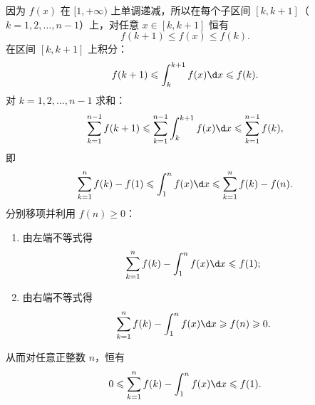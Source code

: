 \begin{solution}
    因为 $f(x)$ 在 $[1, +\infty)$ 上单调递减，所以在每个子区间 $[k, k+1]$（$k = 1, 2, \dots, n-1$）上，对任意 $x \in [k, k+1]$ 恒有
    \begin{equation}
        f(k+1) \leqslant f(x) \leqslant f(k).
    \end{equation}
    在区间 $[k, k+1]$ 上积分：
    \begin{equation}
        f(k+1) \leqslant \int_k^{k+1} f(x) \d x \leqslant f(k).
    \end{equation}
    对 $k = 1, 2, \dots, n-1$ 求和：
    \begin{equation}
        \sum_{k=1}^{n-1} f(k+1) \leqslant \sum_{k=1}^{n-1} \int_k^{k+1} f(x) \d x \leqslant \sum_{k=1}^{n-1} f(k),
    \end{equation}
    即
    \begin{equation}
        \sum_{k=1}^n f(k) - f(1) \leqslant \int_1^n f(x) \d x \leqslant \sum_{k=1}^n f(k) - f(n).
    \end{equation}
    分别移项并利用 $f(n) \geqslant 0$：
    \begin{enumerate}
        \item 由左端不等式得
              \begin{equation}
                  \sum_{k=1}^n f(k) - \int_1^n f(x) \d x \leqslant f(1);
              \end{equation}
        \item 由右端不等式得
              \begin{equation}
                  \sum_{k=1}^n f(k) - \int_1^n f(x) \d x \geqslant f(n) \geqslant 0.
              \end{equation}
    \end{enumerate}
    从而对任意正整数 $n$，恒有
    \begin{equation}
        0 \leqslant \sum_{k=1}^n f(k) - \int_1^n f(x) \d x \leqslant f(1).
    \end{equation}

    \begin{center}
\end{center}
\end{solution}
